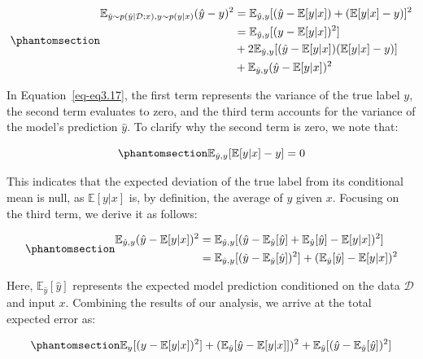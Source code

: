 \documentclass[
  letterpaper,
  numbers=noenddot,
  DIV=11]{scrreprt}
\theoremstyle{plain}
\theoremstyle{definition}
\theoremstyle{plain}
\theoremstyle{remark}
\begin{document}
\begin{equation}\phantomsection\label{eq-eq3.17}{\begin{aligned}
\mathbb{E}_{\hat{y} \sim p(\hat{y} | \mathcal{D}; x), y \sim p(y|x)} (\hat{y} - y)^2 &= \mathbb{E}_{\hat{y}, y}[(\hat{y} - \mathbb{E}[y|x]) + (\mathbb{E}[y|x] - y)]^2 \\
&= \mathbb{E}_{\hat{y}, y} [(y - \mathbb{E}[y|x])^2]\\
&+ 2\mathbb{E}_{\hat{y}, y} [(\hat{y} - \mathbb{E}[y|x])(\mathbb{E}[y|x] - y)]\\
&+ \mathbb{E}_{\hat{y}, y}(\hat{y} - \mathbb{E}[y|x])^2
\end{aligned}}\end{equation}

In Equation~\ref{eq-eq3.17}, the first term represents the variance of
the true label \(y\), the second term evaluates to zero, and the third
term accounts for the variance of the model's prediction \(\hat{y}\). To
clarify why the second term is zero, we note that:

\begin{equation}\phantomsection\label{eq-eq3.18}{
\mathbb{E}_{\hat{y}, y}[\mathbb{E}[y|x] - y] = 0
}\end{equation}

This indicates that the expected deviation of the true label from its
conditional mean is null, as \(\mathbb{E}[y|x]\) is, by definition, the
average of \(y\) given \(x\). Focusing on the third term, we derive it
as follows:

\begin{equation}\phantomsection\label{eq-eq3.19}{\begin{aligned}
\mathbb{E}_{\hat{y}, y}(\hat{y} - \mathbb{E}[y|x])^2 &= \mathbb{E}_{\hat{y}, y}[(\hat{y} - \mathbb{E}_{\hat{y}}[\hat{y}] + \mathbb{E}_{\hat{y}}[\hat{y}] - \mathbb{E}[y|x])^2] \\
&= \mathbb{E}_{\hat{y}, y}[(\hat{y} - \mathbb{E}_{\hat{y}}[\hat{y}])^2] + (\mathbb{E}_{\hat{y}}[\hat{y}] - \mathbb{E}[y|x])^2
\end{aligned}}\end{equation}

Here, \(\mathbb{E}_{\hat{y}}[\hat{y}]\) represents the expected model
prediction conditioned on the data \(\mathcal{D}\) and input \(x\).
Combining the results of our analysis, we arrive at the total expected
error as:

\begin{equation}\phantomsection\label{eq-eq3.20}{
\mathbb{E}_{y} [(y - \mathbb{E}[y|x])^2] + (\mathbb{E}_{\hat{y}} [\hat{y} - \mathbb{E}[y|x]] )^2 + \mathbb{E}_{\hat{y}} [(\hat{y} - \mathbb{E}_{\hat{y}}[\hat{y}])^2]
}\end{equation}
\end{document}
